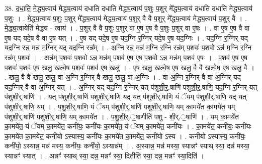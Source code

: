 \documentclass[17pt]{extarticle}
\begin{document}
38. द॒धा॒ति॒ मे॒द्ध्य॒त्वाय॑ मेद्ध्य॒त्वाय॑ दधाति दधाति मेद्ध्य॒त्वाय॑ प॒शुः प॒शुर् मे᳚द्ध्य॒त्वाय॑ दधाति दधाति मेद्ध्य॒त्वाय॑ प॒शुः । . मे॒द्ध्य॒त्वाय॑ प॒शुः प॒शुर् मे᳚द्ध्य॒त्वाय॑ मेद्ध्य॒त्वाय॑ प॒शुर् वै वै प॒शुर् मे᳚द्ध्य॒त्वाय॑ मेद्ध्य॒त्वाय॑ प॒शुर् वै । . मे॒द्ध्य॒त्वायेति॑ मेद्ध्य - त्वाय॑ । . प॒शुर् वै वै प॒शुः प॒शुर् वा ए॒ष ए॒ष वै प॒शुः प॒शुर् वा ए॒षः । . वा ए॒ष ए॒ष वै वा ए॒ष यद् यदे॒ष वै वा ए॒ष यत् । . ए॒ष यद् यदे॒ष ए॒ष यद॒ग्नि र॒ग्निर् यदे॒ष ए॒ष यद॒ग्निः । . यद॒ग्नि र॒ग्निर् यद् यद॒ग्नि रन्न॒ मन्न॑ म॒ग्निर् यद् यद॒ग्नि रन्न᳚म् । . अ॒ग्नि रन्न॒ मन्न॑ म॒ग्नि र॒ग्नि रन्न॑म् प॒शवः॑ प॒शवो ऽन्न॑ म॒ग्नि र॒ग्नि रन्न॑म् प॒शवः॑ । . अन्न॑म् प॒शवः॑ प॒शवो ऽन्न॒ मन्न॑म् प॒शव॑ ए॒ष ए॒ष प॒शवो ऽन्न॒ मन्न॑म् प॒शव॑ ए॒षः । . प॒शव॑ ए॒ष ए॒ष प॒शवः॑ प॒शव॑ ए॒ष खलु॒ खल्वे॒ष प॒शवः॑ प॒शव॑ ए॒ष खलु॑ । . ए॒ष खलु॒ खल्वे॒ष ए॒ष खलु॒ वै वै खल्वे॒ष ए॒ष खलु॒ वै । . खलु॒ वै वै खलु॒ खलु॒ वा अ॒ग्नि र॒ग्निर् वै खलु॒ खलु॒ वा अ॒ग्निः । . वा अ॒ग्नि र॒ग्निर् वै वा अ॒ग्निर् यद् यद॒ग्निर् वै वा अ॒ग्निर् यत् । . अ॒ग्निर् यद् यद॒ग्नि र॒ग्निर् यत् प॑शुशी॒र्॒.षाणि॑ पशुशी॒र्॒.षाणि॒ यद॒ग्नि र॒ग्निर् यत् प॑शुशी॒र्॒.षाणि॑ । . यत् प॑शुशी॒र्॒.षाणि॑ पशुशी॒र्॒.षाणि॒ यद् यत् प॑शुशी॒र्॒.षाणि॒ यं ॅयम् प॑शुशी॒र्॒.षाणि॒ यद् यत् प॑शुशी॒र्॒.षाणि॒ यम् । . प॒शु॒शी॒र्॒.षाणि॒ यं ॅयम् प॑शुशी॒र्॒.षाणि॑ पशुशी॒र्॒.षाणि॒ यम् का॒मये॑त का॒मये॑त॒ यम् प॑शुशी॒र्॒.षाणि॑ पशुशी॒र्॒.षाणि॒ यम् का॒मये॑त । . प॒शु॒शी॒र्.॒षाणीति॑ पशु - शी॒र्.॒षाणि॑ । . यम् का॒मये॑त का॒मये॑त॒ यं ॅयम् का॒मये॑त॒ कनी॑यः॒ कनी॑यः का॒मये॑त॒ यं ॅयम् का॒मये॑त॒ कनी॑यः । . का॒मये॑त॒ कनी॑यः॒ कनी॑यः का॒मये॑त का॒मये॑त॒ कनी॑यो ऽस्यास्य॒ कनी॑यः का॒मये॑त का॒मये॑त॒ कनी॑यो ऽस्य । . कनी॑यो ऽस्यास्य॒ कनी॑यः॒ कनी॑यो॒ ऽस्यान्न॒ मन्न॑ मस्य॒ कनी॑यः॒ कनी॑यो॒ ऽस्यान्न᳚म् । . अ॒स्यान्न॒ मन्न॑ मस्या॒ स्यान्नꣳ॑ स्याथ् स्या॒ दन्न॑ मस्या॒ स्यान्नꣳ॑ स्यात् । . अन्नꣳ॑ स्याथ् स्या॒ दन्न॒ मन्नꣳ॑ स्या॒ दितीति॑ स्या॒ दन्न॒ मन्नꣳ॑ स्या॒दिति॑ । \newline
\pagebreak
{}
\end{document}
